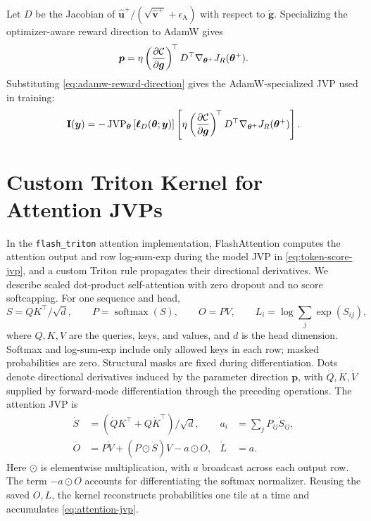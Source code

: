 \documentclass{article} %
\begin{document}
Let \(D\) be the Jacobian of
\(\widehat{\boldsymbol{u}}^+/
(\sqrt{\widehat{\boldsymbol{v}}^+}+\epsilon_{\mathrm{A}})\) with respect to
\(\widetilde{\boldsymbol{g}}\). Specializing the optimizer-aware reward
direction to AdamW gives
\begin{equation}
    \boldsymbol{p}
    =
    \eta
    \left(
        \frac{\partial\mathcal C}{\partial\boldsymbol{g}}
    \right)^{\!\top}
    D^\top
    \nabla_{\bm{\theta}^+}J_R(\bm{\theta}^+).
    \label{eq:adamw-reward-direction}
\end{equation}
Substituting \cref{eq:adamw-reward-direction} gives the AdamW-specialized JVP
used in training:
\begin{equation}
    \mathbf{I}(\bm{y})
    =
    -
    \operatorname{JVP}_{\bm{\theta}}
    \left[
        \boldsymbol{\ell}_D(\bm{\theta};\bm{y})
    \right]
    \left[
        \eta
        \left(
            \frac{\partial\mathcal C}{\partial\boldsymbol{g}}
        \right)^{\!\top}
        D^\top
        \nabla_{\bm{\theta}^+}J_R(\bm{\theta}^+)
    \right].
    \label{eq:adamw-token-jvp}
\end{equation}

\section{Custom Triton Kernel for Attention JVPs}
\label{app:attention-jvp}

In the \texttt{flash\_triton} attention implementation, FlashAttention computes
the attention output and row log-sum-exp during the model JVP in
\cref{eq:token-score-jvp}, and a custom Triton rule propagates their
directional derivatives. We describe scaled dot-product self-attention
with zero dropout and no score softcapping. For one sequence and head,
\[
    S=QK^\top/\sqrt d,\qquad P=\operatorname{softmax}(S),\qquad
    O=PV,\qquad L_i=\log\sum_j\exp(S_{ij}),
\]
where \(Q,K,V\) are the queries, keys, and values, and \(d\) is the head
dimension. Softmax and log-sum-exp include only allowed keys in each row;
masked probabilities are zero. Structural masks are fixed during differentiation.
Dots denote
directional derivatives induced by the parameter direction
\(\boldsymbol p\), with \(\dot Q,\dot K,\dot V\) supplied by forward-mode
differentiation through the preceding operations. The attention JVP is
\begin{align}
    \dot S&=(\dot QK^\top+Q\dot K^\top)/\sqrt d,
    & a_i&=\sum_jP_{ij}\dot S_{ij},\nonumber\\
    \dot O&=P\dot V+(P\odot\dot S)V-a\odot O,
    & \dot L&=a.
    \label{eq:attention-jvp}
\end{align}
Here \(\odot\) is elementwise multiplication, with \(a\) broadcast across
each output row. The term \(-a\odot O\) accounts for differentiating the
softmax normalizer. Reusing the saved \(O,L\), the kernel reconstructs
probabilities one tile at a time and accumulates \cref{eq:attention-jvp}.
\end{document}
